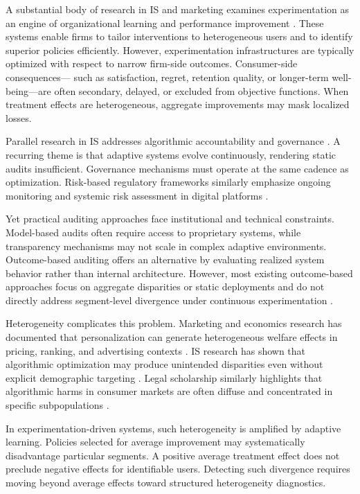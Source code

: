 \documentclass[11pt,letterpaper,english]{article}
\theoremstyle{definition}
\theoremstyle{definition}
\begin{document}
\begin{bibunit}
A substantial body of research in IS and marketing examines experimentation as 
an engine of organizational learning and performance improvement 
\citep{kohavi2020trustworthy, bojinnov2022_review}. These systems enable 
firms to tailor interventions to heterogeneous users and to identify superior 
policies efficiently. However, experimentation infrastructures are typically 
optimized with respect to narrow firm-side outcomes. Consumer-side consequences—
such as satisfaction, regret, retention quality, or longer-term well-being—are 
often secondary, delayed, or excluded from objective functions. When treatment 
effects are heterogeneous, aggregate improvements may mask localized losses.

Parallel research in IS addresses algorithmic accountability and governance 
\citep{kroll2017_accountable_algorithms, raji2020_internal_audit, rai2020explainable}. 
A recurring theme is that adaptive systems evolve continuously, rendering static 
audits insufficient. Governance mechanisms must operate at the same cadence as 
optimization. Risk-based regulatory frameworks similarly emphasize ongoing 
monitoring and systemic risk assessment in digital platforms 
\citep{dsa2022article34, eu2024aiact}. 

Yet practical auditing approaches face institutional and technical constraints. 
Model-based audits often require access to proprietary systems, while transparency 
mechanisms may not scale in complex adaptive environments. Outcome-based auditing 
offers an alternative by evaluating realized system behavior rather than internal 
architecture. However, most existing outcome-based approaches focus on aggregate 
disparities or static deployments and do not directly address segment-level 
divergence under continuous experimentation \citep{goodman2022_auditwashing}.

Heterogeneity complicates this problem. Marketing and economics research has 
documented that personalization can generate heterogeneous welfare effects in 
pricing, ranking, and advertising contexts \citep{dube2023personalized, 
ursu2018power, donnelly2024_welfare}. IS research has shown that algorithmic 
optimization may produce unintended disparities even without explicit demographic 
targeting \citep{lambrecht2019algorithmic}. Legal scholarship similarly highlights 
that algorithmic harms in consumer markets are often diffuse and concentrated 
in specific subpopulations \citep{bar2023algorithmic}. 

In experimentation-driven systems, such heterogeneity is amplified by adaptive 
learning. Policies selected for average improvement may systematically disadvantage 
particular segments. A positive average treatment effect does not preclude negative 
effects for identifiable users. Detecting such divergence requires moving beyond 
average effects toward structured heterogeneity diagnostics.


\end{bibunit}
\end{document}
